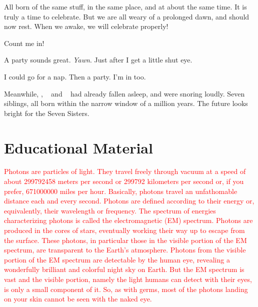 \documentclass[main.tex]{subfiles}
\begin{document}
\par \Maia All born of the same stuff, in the same place, and at about the same time.  It is truly a time to celebrate.  But we are all weary of a prolonged dawn, and should now rest.  When we awake, we will celebrate properly!

\par \Merope  Count me in!  

\par \Electra A party sounds great. \textit{Yawn}. Just after I get a little shut eye.

\par \Sterope I could go for a nap. Then a party.  I'm in too.

\par \nar Meanwhile, \rmtaygete, \rmalcyone~ and \rmcelaeno~ had already fallen asleep, and were snoring loudly.  Seven siblings, all born within the narrow window of a million years.  The future looks bright for the Seven Sisters.

\section{Educational Material}

\begin{tcolorbox}[sharp corners, colback=red!30, colframe=red!80!blue, title=Photons$^{{^1}}$]
\par \textcolor{red} {Photons are particles of light.  They travel freely through vacuum at a speed of about 299792458 meters per second or 299792 kilometers per second or, if you prefer, 671000000 miles per hour.  Basically, photons travel an unfathomable distance each and every second.  Photons are defined according to their energy or, equivalently, their wavelength or frequency.  The spectrum of energies characterizing photons is called the electromagnetic (EM) spectrum.  Photons are produced in the cores of stars, eventually working their way up to escape from the surface.  These photons, in particular those in the visible portion of the EM spectrum, are transparent to the Earth's atmosphere.  Photons from the visible portion of the EM spectrum are detectable by the human eye, revealing a wonderfully brilliant and colorful night sky on Earth.  But the EM spectrum is vast and the visible portion, namely the light humans can detect with their eyes, is only a small component of it.  So, as with germs, most of the photons landing on your skin cannot be seen with the naked eye.}
\end{tcolorbox}
\end{document}
